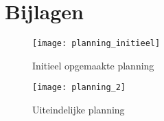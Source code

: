 \chapter{Bijlagen}
\label{sec:bijlagen}


\begin{figure}[H]
	\centering
	\texttt{[image: planning\_initieel]}
	\caption{Initieel opgemaakte planning}
	\label{fig:planning_initieel}
\end{figure}

\begin{figure}[H]
	\centering
	\texttt{[image: planning\_2]}
	\caption{Uiteindelijke planning}
	\label{fig:planning_uiteindelijk}
\end{figure}

